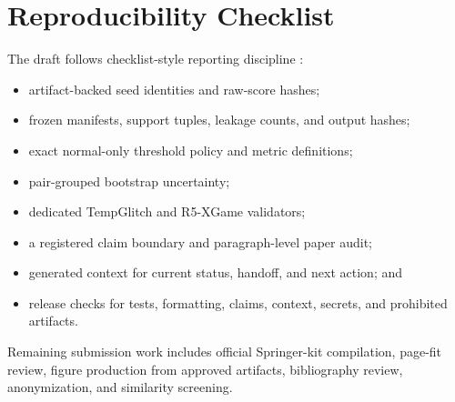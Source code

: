 \section{Reproducibility Checklist}
\label{app:reproducibility-checklist}

The draft follows checklist-style reporting discipline \cite{pineau2021reproducibility}:
\begin{itemize}[leftmargin=*]
\item artifact-backed seed identities and raw-score hashes;
\item frozen manifests, support tuples, leakage counts, and output hashes;
\item exact normal-only threshold policy and metric definitions;
\item pair-grouped bootstrap uncertainty;
\item dedicated TempGlitch and R5-XGame validators;
\item a registered claim boundary and paragraph-level paper audit;
\item generated context for current status, handoff, and next action; and
\item release checks for tests, formatting, claims, context, secrets, and prohibited artifacts.
\end{itemize}

Remaining submission work includes official Springer-kit compilation, page-fit review, figure
production from approved artifacts, bibliography review, anonymization, and similarity screening.
